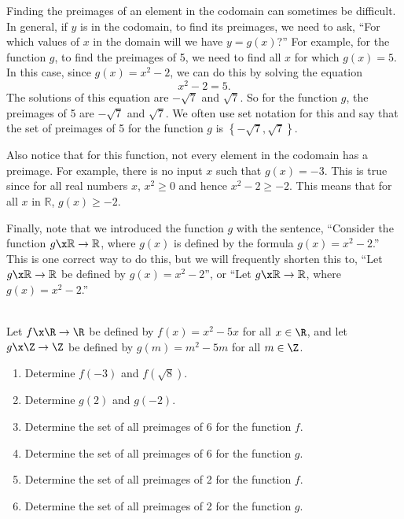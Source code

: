 Finding the preimages of an element in the codomain can sometimes be difficult.  In general, if  $y$ is in the codomain, to find its preimages, we need to ask, ``For which values of  $x$  in the domain will we have  
$y = g( x )$?''  For example, for the function  $g$, to find the preimages of  5, we need to find all  $x$  for which  $g( x ) = 5$.  In this case, since  $g( x ) = x^2  - 2$, we can do this by solving the equation
\[
x^2  - 2 = 5.
\]
The solutions of this equation are  $ - \sqrt 7 $  and  $\sqrt 7 $.  So for the function  $g$, the preimages of  5  are  $ - \sqrt 7 $  and  $\sqrt 7 $.  We often use set notation for this  and say that the set of preimages of 5 for the function $g$ is 
$\left\{ -\sqrt{7}, \sqrt{7} \right\}$.

Also notice that for this function, not every element in the codomain has a preimage.  For example, there is no input  $x$  such that  $g\left( x \right) =  - 3$.  This is true since for all real numbers  $x$,  $x^2  \geq 0$  and hence  $x^2  - 2 \geq  - 2$.  This means that for all  $x$  in  $\mathbb{R}$, $g\left( x \right) \geq  - 2$.

Finally, note that we introduced the function $g$ with the sentence, ``Consider the function  
$g\x \mathbb{R} \to \mathbb{R}$, where  $g( x )$  is defined by the formula  
$g( x ) = x^2  - 2$.''  This is one correct way to do this, but we will frequently shorten this to, ``Let  $g\x \mathbb{R} \to \mathbb{R}$ be defined by  $g( x ) = x^2  - 2$'', or ``Let  
$g\x \mathbb{R} \to \mathbb{R}$, where  $g( x ) = x^2  - 2$.''

\begin{prog} \label{pr:images} \hfill \\
Let $f\x \R \to \R$ be defined by $f(x) = x^2 - 5x$ for all $x \in \R$, and let 
$g\x \Z \to \Z$ be defined by $g(m) = m^2 - 5m$ for all $m \in \Z$.

\begin{enumerate}
\item Determine $f ( -3 )$ and $f \left( \sqrt 8 \right)$.

\item Determine $g ( 2 )$ and $g ( -2 )$.

\item Determine the set of all preimages of 6 for the function $f$\!.

\item Determine the set of all preimages of 6 for the function $g$\!.

\item Determine the set of all preimages of 2 for the function $f$\!.

\item Determine the set of all preimages of 2 for the function $g$\!.
\end{enumerate}
\end{prog}
\hbreak


\endinput
